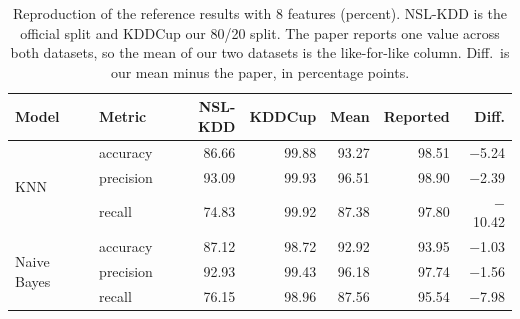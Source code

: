 \begin{table}[t]
\centering
\caption{Reproduction of the reference results with 8 features (percent). NSL-KDD is the official split and KDDCup our 80/20 split. The paper reports one value across both datasets, so the mean of our two datasets is the like-for-like column. Diff.\ is our mean minus the paper, in percentage points.}
\label{tab:paper}
\footnotesize
\setlength{\tabcolsep}{2.5pt}
\begin{tabular}{llrrrrr}
\toprule
Model & Metric & NSL-KDD & KDDCup & Mean & Reported & Diff. \\
\midrule
\multirow{3}{*}{KNN} & accuracy & 86.66 & 99.88 & 93.27 & 98.51 & $-$5.24 \\
 & precision & 93.09 & 99.93 & 96.51 & 98.90 & $-$2.39 \\
 & recall & 74.83 & 99.92 & 87.38 & 97.80 & $-$10.42 \\
\midrule
\multirow{3}{*}{Naive Bayes} & accuracy & 87.12 & 98.72 & 92.92 & 93.95 & $-$1.03 \\
 & precision & 92.93 & 99.43 & 96.18 & 97.74 & $-$1.56 \\
 & recall & 76.15 & 98.96 & 87.56 & 95.54 & $-$7.98 \\
\bottomrule
\end{tabular}
\end{table}
